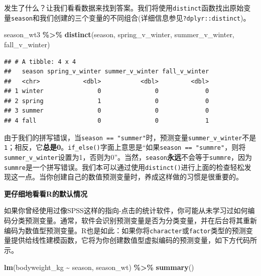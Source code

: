 \documentclass[
]{book}
\newenvironment{Shaded}{\begin{snugshade}}{\end{snugshade}}
\newcommand{\FunctionTok}[1]{\textcolor[rgb]{0.13,0.29,0.53}{\textbf{#1}}}
\newcommand{\NormalTok}[1]{#1}
\newcommand{\SpecialCharTok}[1]{\textcolor[rgb]{0.81,0.36,0.00}{\textbf{#1}}}
\begin{document}
发生了什么？让我们看看数据来找到答案。我们将使用\texttt{distinct}函数找出原始变量\texttt{season}和我们创建的三个变量的不同组合(详细信息参见\texttt{?dplyr::distinct})。

\begin{Shaded}
\begin{Highlighting}[]
\NormalTok{season\_wt3 }\SpecialCharTok{\%\textgreater{}\%}
  \FunctionTok{distinct}\NormalTok{(season, spring\_v\_winter, summer\_v\_winter, fall\_v\_winter)}
\end{Highlighting}
\end{Shaded}

\begin{verbatim}
## # A tibble: 4 x 4
##   season spring_v_winter summer_v_winter fall_v_winter
##   <chr>            <dbl>           <dbl>         <dbl>
## 1 winter               0               0             0
## 2 spring               1               0             0
## 3 summer               0               0             0
## 4 fall                 0               0             1
\end{verbatim}

由于我们的拼写错误，当\texttt{season\ ==\ "summer"}时，预测变量\texttt{summer\_v\_winter}不是\texttt{1}；相反，它\textbf{总是0}。\texttt{if\_else()}字面上意思是``如果\texttt{season\ ==\ "summre"}，则将\texttt{summer\_v\_winter}设置为1，否则为0''。当然，\texttt{season}\textbf{永远}不会等于\texttt{summre}，因为\texttt{summre}是一个拼写错误。我们本可以通过使用\texttt{distinct()}进行上面的检查轻松发现这一点。当你创建自己的数值预测变量时，养成这样做的习惯是很重要的。

\textbf{更仔细地看看R的默认情况}

如果你曾经使用过像SPSS这样的指向-点击的统计软件，你可能从未学习过如何编码分类预测变量。通常，软件会识别预测变量是否为分类变量，并在后台将其重新编码为数值型预测变量。R也是如此：如果你将\texttt{character}或\texttt{factor}类型的预测变量提供给线性建模函数，它将为你创建数值型虚拟编码的预测变量，如下方代码所示。

\begin{Shaded}
\begin{Highlighting}[]
\FunctionTok{lm}\NormalTok{(bodyweight\_kg }\SpecialCharTok{\textasciitilde{}}\NormalTok{ season, season\_wt) }\SpecialCharTok{\%\textgreater{}\%}
  \FunctionTok{summary}\NormalTok{()}
\end{Highlighting}
\end{Shaded}
\end{document}
